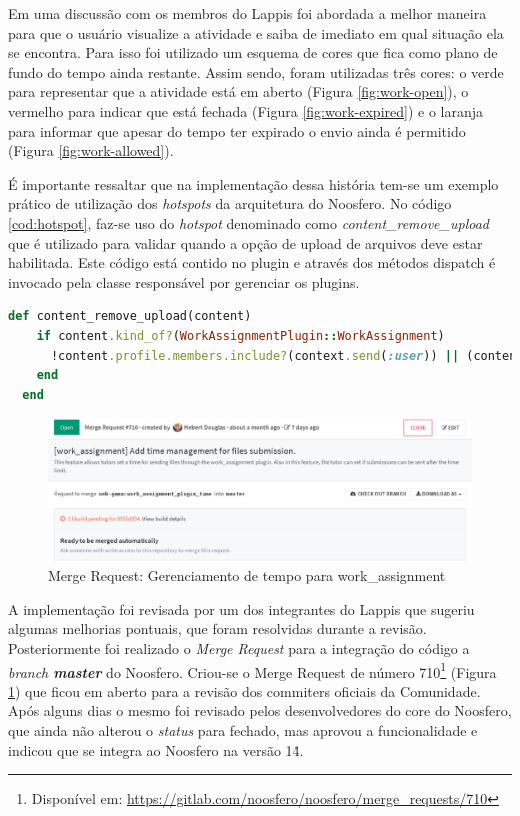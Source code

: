 Em uma discussão com os membros do Lappis foi abordada a melhor maneira para que o usuário visualize a atividade e saiba de imediato em qual situação ela se encontra. Para isso foi utilizado um esquema de cores que fica como plano de fundo do tempo ainda restante. Assim sendo, foram utilizadas três cores: o verde para representar que a atividade está em aberto (Figura \ref{fig:work-open}), o vermelho para indicar que está fechada (Figura \ref{fig:work-expired}) e o laranja para informar que apesar do tempo ter expirado o envio ainda é permitido (Figura \ref{fig:work-allowed}).

É importante ressaltar que na implementação dessa história tem-se um exemplo prático de utilização dos \textit{hotspots} da arquitetura do Noosfero. No código \ref{cod:hotspot}, faz-se uso do \textit{hotspot} denominado como \textit{content\_remove\_upload} que é utilizado para validar quando a opção de upload de arquivos deve estar habilitada. Este código está contido no plugin e através dos métodos dispatch é invocado pela classe responsável por gerenciar os plugins.

\begin{lstlisting}[language=Ruby, caption={Código de implementação do \textit{hotspot}}, label=cod:hotspot]
  def content_remove_upload(content)
    if content.kind_of?(WorkAssignmentPlugin::WorkAssignment)
      !content.profile.members.include?(context.send(:user)) || (content.expired? && !content.ignore_time)
    end
  end
\end{lstlisting}

\begin{figure}[h]
    \centering
    \includegraphics[keepaspectratio=true,scale=0.42]
      {figuras/merge-request710.eps}
    \caption{Merge Request: Gerenciamento de tempo para work\_assignment}
    \label{fig:merge-710}
\end{figure}

A implementação foi revisada por um dos integrantes do Lappis que sugeriu algumas melhorias pontuais, que foram resolvidas durante a revisão. Posteriormente foi realizado o \textit{Merge Request} para a integração do código a \textit{branch \textbf{master}} do Noosfero. Criou-se o Merge Request de número 710\footnote{Disponível em: \url{https://gitlab.com/noosfero/noosfero/merge_requests/710}} (Figura \ref{fig:merge-710}) que ficou em aberto para a revisão dos commiters oficiais da Comunidade. Após alguns dias o mesmo foi revisado pelos desenvolvedores do core do Noosfero, que ainda não alterou o \textit{status} para fechado, mas aprovou a funcionalidade e indicou que se integra ao Noosfero na versão 1\.4.

